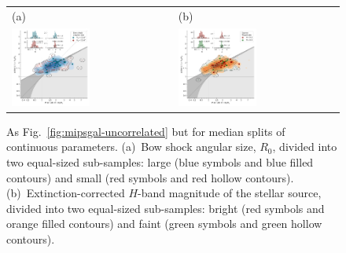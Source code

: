 \begin{figure}
  \setlength\tabcolsep{0pt}
  \begin{tabular}{ll}
    (a) & (b) \\
    \includegraphics[width=0.5\textwidth]{figs/mipsgal-Rc-R90-R0} &
    \includegraphics[width=0.5\textwidth]{figs/mipsgal-Rc-R90-Mag} 
  \end{tabular}
  \caption[]{As Fig.~\ref{fig:mipsgal-uncorrelated} but for median
    splits of continuous parameters. (a)~Bow shock angular size,
    \(R_0\), divided into two equal-sized sub-samples: large (blue
    symbols and blue filled contours) and small (red symbols and red
    hollow contours).  (b)~Extinction-corrected \(H\)-band magnitude
    of the stellar source, divided into two equal-sized sub-samples:
    bright (red symbols and orange filled contours) and faint (green
    symbols and green hollow contours).}
  \label{fig:mipsgal-correlated}
\end{figure}


